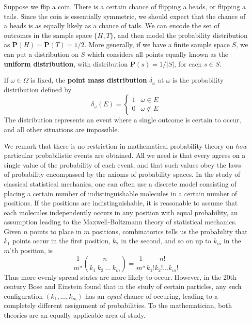 \begin{example}
    Suppose we flip a coin. There is a certain chance of flipping a heads, or flipping a tails. Since the coin is essentially symmetric, we should expect that the chance of a heads is as equally likely as a chance of tails. We can encode the set of outcomes in the sample space $\{ H, T \}$, and then model the probability distribution as $\mathbf{P}(H) = \mathbf{P}(T) = 1/2$. More generally, if we have a finite sample space $S$, we can put a distribution on $S$ which considers all points equally known as the {\bf uniform distribution}, with distribution $\mathbf{P}(s) = 1/|S|$, for each $s \in S$.
\end{example}

\begin{example}
    If $\omega \in \Omega$ is fixed, the {\bf point mass distribution} $\delta_\omega$ at $\omega$ is the probability distribution defined by
    \[ \delta_\omega(E) = \begin{cases} 1 & \omega \in E \\ 0 & \omega \not \in E \end{cases} \]
    The distribution represents an event where a single outcome is certain to occur, and all other situations are impossible.
\end{example}

We remark that there is no restriction in mathematical probability theory on {\it how} particular probabilistic events are obtained. All we need is that every agrees on a single value of the probability of each event, and that such values obey the laws of probability encompassed by the axioms of probability spaces. In the study of classical statistical mechanics, one can often use a discrete model consisting of placing a certain number of indistinguishable molecules in a certain number of positions. If the positions are indistinguishable, it is reasonable to assume that each molecules independently occurs in any position with equal probability, an assumption leading to the Maxwell-Boltzmann theory of statistical mechanics. Given $n$ points to place in $m$ positions, combinatorics tells us the probability that $k_1$ points occur in the first position, $k_2$ in the second, and so on up to $k_m$ in the $m$'th position, is
%
\[ \frac{1}{m^n} {n \choose k_1\ k_2\ \dots\ k_m} = \frac{1}{m^n} \frac{n!}{k_1! k_2! \dots k_m!} \]
%
Thus more evenly spread states are more likely to occur. However, in the 20th century Bose and Einstein found that in the study of certain particles, any such configuration $(k_1, \dots, k_m)$ has an {\it equal} chance of occuring, leading to a completely different assignment of probabilities. To the mathematician, both theories are an equally applicable area of study.

